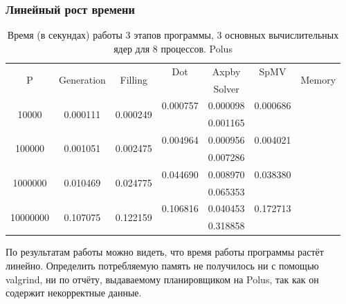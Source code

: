 	\subsubsection{Линейный рост времени}
		\begin{table}[H]
			\begin{tabular}{|c||c|c|c|c|c|c|}
				\hline
				\multirow{2}{*}{P} &  \multirow{2}{*}{Generation} & \multirow{2}{*}{Filling} & Dot & Axpby & SpMV          & \multirow{2}{*}{Memory} \\ \cline{4-6}
				                   &                              &                         & \multicolumn{3}{c|}{Solver}  &                         \\ \hline
                \multirow{2}{*}{10000} & \multirow{2}{*}{0.000111} & \multirow{2}{*}{0.000249} & 0.000757 & 0.000098 & 0.000686              & \multirow{2}{*}{} \\ \cline{4-6}
                                       &                     &                    & \multicolumn{3}{c|}{0.001165} &               \\ \hline
                \multirow{2}{*}{100000} &  \multirow{2}{*}{0.001051} & \multirow{2}{*}{0.002475} & 0.004964 & 0.000956 & 0.004021 & \multirow{2}{*}{} \\ \cline{4-6}
                                      &                     &                     & \multicolumn{3}{c|}{0.007286} &  \\ \hline
                \multirow{2}{*}{1000000} &  \multirow{2}{*}{0.010469} & \multirow{2}{*}{0.024775} & 0.044690 & 0.008970 & 0.038380 & \multirow{2}{*}{} \\ \cline{4-6}
                                       &                     &                    & \multicolumn{3}{c|}{0.065353} &  \\ \hline
                \multirow{2}{*}{10000000} &  \multirow{2}{*}{0.107075} & \multirow{2}{*}{0.122159} & 0.106816 & 0.040453 & 0.172713 & \multirow{2}{*}{} \\ \cline{4-6}
                                       &                     &                    & \multicolumn{3}{c|}{0.318858} &  \\ \hline
			\end{tabular}
			\caption{Время (в секундах) работы 3 этапов программы, 3 основных вычислительных ядер для 8 процессов. Polus}
			\label{lineal}
		\end{table}
		По результатам работы можно видеть, что время работы программы растёт линейно. Определить потребляемую память не получилось ни с помощью valgrind, ни по отчёту, выдаваемому планировщиком на Polus, так как он содержит некорректные данные.
